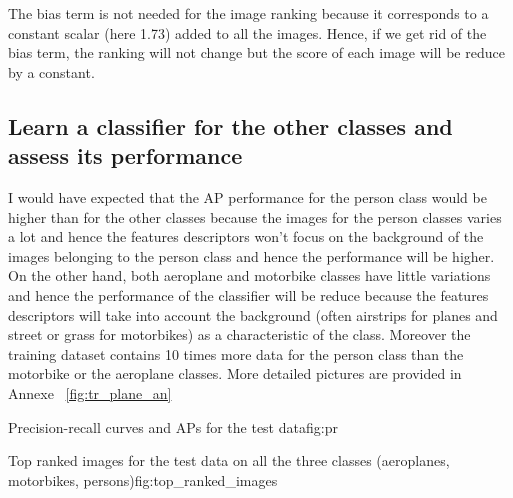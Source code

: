 \documentclass{article}
\begin{document}
The bias term is not needed for the image ranking because it corresponds to a constant scalar (here 1.73) added to all the images. Hence, if we get rid of the bias term, the ranking will not change but the score of each image will be reduce by a constant.

\subsection{Learn a classifier for the other classes and assess its performance}

I would have expected that the AP performance for the person class would be higher than for the other classes because the images for the person classes varies a lot and hence the features descriptors won't focus on the background of the images belonging to the person class and hence the performance will be higher. On the other hand, both aeroplane and motorbike classes have little variations and hence the performance of the classifier will be reduce because the features descriptors will take into account the background (often airstrips for planes and street or grass for motorbikes) as a characteristic of the class. Moreover the training dataset contains 10 times more data for the person class than the motorbike or the aeroplane classes. More detailed pictures are provided in Annexe ~\ref{fig:tr_plane_an}

          {}
          {}
          {Precision-recall curves and APs for the test data}{fig:pr}

          {}
          {}
          {Top ranked images for the test data on all the three classes (aeroplanes, motorbikes, persons)}{fig:top_ranked_images}

\end{document}

